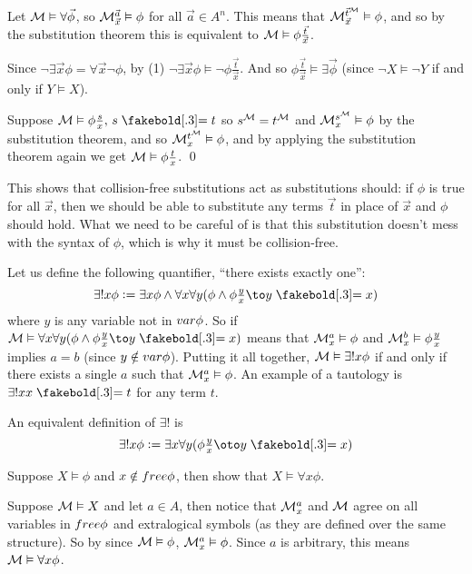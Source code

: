 \ecoro

\benum
    \item Let ${\cal M}\vDash\forall\vec\phi$, so ${\cal M}^{\vec a}_{\vec x}\vDash\phi$ for all $\vec a\in A^n$.
    This means that ${\cal M}^{\vec t^{\cal M}}_{\vec x}\vDash\phi$, and so by the substitution theorem this is equivalent to ${\cal M}\vDash\phi\frac{\vec t}{\vec x}$.
    \item Since $\neg\exists\vec x\phi=\forall\vec x\neg\phi$, by (1) $\neg\exists\vec x\phi\vDash\neg\phi\frac{\vec t}{\vec x}$.
    And so $\phi\frac{\vec t}{\vec x}\vDash\exists\vec\phi$ (since $\neg X\vDash\neg Y$ if and only if $Y\vDash X$).
    \item Suppose ${\cal M}\vDash\phi\frac sx,\,s\eq t$ so $s^{\cal M}=t^{\cal M}$ and ${\cal M}^{s^{\cal M}}_x\vDash\phi$ by the substitution theorem, and so ${\cal M}^{t^{\cal M}}_x\vDash\phi$, and
    by applying the substitution theorem again we get ${\cal M}\vDash\phi\frac tx$.
    \qed
\eenum

This shows that collision-free substitutions act as substitutions should: if $\phi$ is true for all $\vec x$, then we should be able to substitute any terms $\vec t$ in place of $\vec x$ and $\phi$ should
hold.
What we need to be careful of is that this substitution doesn't mess with the syntax of $\phi$, which is why it must be collision-free.

Let us define the following quantifier, ``there exists exactly one'':
$$ \exists!x\phi \coloneqq \exists x\phi\land\forall x\forall y(\phi\land\phi\tfrac yx\to y\eq x) $$
where $y$ is any variable not in ${\sl var}\phi$.
So if ${\cal M}\vDash\forall x\forall y(\phi\land\phi\frac yx\to y\eq x)$ means that ${\cal M}^a_x\vDash\phi$ and ${\cal M}^b_x\vDash\phi\frac yx$ implies $a=b$ (since $y\notin{\sl var}\phi$).
Putting it all together, ${\cal M}\vDash\exists!x\phi$ if and only if there exists a single $a$ such that ${\cal M}^a_x\vDash\phi$.
An example of a tautology is $\exists!x x\eq t$ for any term $t$.

An equivalent definition of $\exists!$ is
$$ \exists!x\phi \coloneqq \exists x\forall y(\phi\tfrac yx\oto y\eq x) $$

\bexerc

    Suppose $X\vDash\phi$ and $x\notin{\sl free}\phi$, then show that $X\vDash\forall x\phi$.

\eexerc

Suppose ${\cal M}\vDash X$ and let $a\in A$, then notice that ${\cal M}^a_x$ and ${\cal M}$ agree on all variables in ${\sl free}\phi$ and extralogical symbols (as they are defined over the same structure).
So by  since ${\cal M}\vDash\phi$, ${\cal M}^a_x\vDash\phi$.
Since $a$ is arbitrary, this means ${\cal M}\vDash\forall x\phi$.

